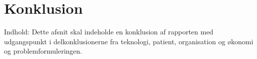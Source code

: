 \chapter{Konklusion}
Indhold: Dette afsnit skal indeholde en konklusion af rapporten med udgangspunkt i delkonklusionerne fra teknologi, patient, organisation og økonomi og problemformuleringen. 
